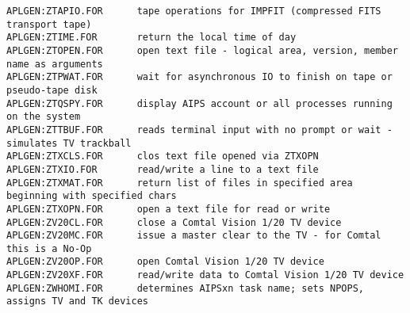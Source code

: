 \begin{verbatim}
APLGEN:ZTAPIO.FOR      tape operations for IMPFIT (compressed FITS transport tape)
APLGEN:ZTIME.FOR       return the local time of day
APLGEN:ZTOPEN.FOR      open text file - logical area, version, member name as arguments
APLGEN:ZTPWAT.FOR      wait for asynchronous IO to finish on tape or pseudo-tape disk
APLGEN:ZTQSPY.FOR      display AIPS account or all processes running on the system
APLGEN:ZTTBUF.FOR      reads terminal input with no prompt or wait - simulates TV trackball
APLGEN:ZTXCLS.FOR      clos text file opened via ZTXOPN
APLGEN:ZTXIO.FOR       read/write a line to a text file
APLGEN:ZTXMAT.FOR      return list of files in specified area beginning with specified chars
APLGEN:ZTXOPN.FOR      open a text file for read or write
APLGEN:ZV20CL.FOR      close a Comtal Vision 1/20 TV device
APLGEN:ZV20MC.FOR      issue a master clear to the TV - for Comtal this is a No-Op
APLGEN:ZV20OP.FOR      open Comtal Vision 1/20 TV device
APLGEN:ZV20XF.FOR      read/write data to Comtal Vision 1/20 TV device
APLGEN:ZWHOMI.FOR      determines AIPSxn task name; sets NPOPS, assigns TV and TK devices
\end{verbatim}
 
